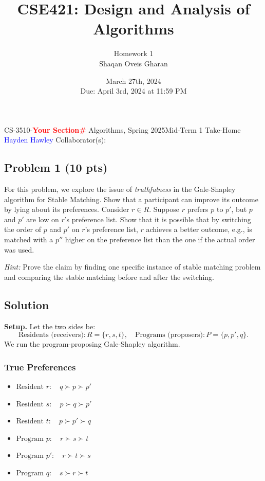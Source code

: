 \documentclass[12pt]{article}
\title{\textbf{CSE421: Design and Analysis of Algorithms}}
\author{Homework 1 \\ Shaqan Oveis Gharan}
\date{March 27th, 2024 \\ Due: April 3rd, 2024 at 11:59 PM}
\newcommand{\red}[1]{\textcolor{red}{#1}}
\newcommand{\blue}[1]{\textcolor{blue}{#1}}
\begin{document}
\noindent CS-3510-\textbf{\red{Your Section\#}} Algorithms, Spring 2025\hfill Mid-Term 1 Take-Home\\
\blue{Hayden} \blue{Hawley} \hfill Collaborator(s):

\hrulefill

\subsection*{Problem 1 (10 pts)}
For this problem, we explore the issue of \textit{truthfulness} in the Gale-Shapley algorithm for Stable Matching. Show that a participant can improve its outcome by lying about its preferences. Consider $r \in R$. Suppose $r$ prefers $p$ to $p'$, but $p$ and $p'$ are low on $r$'s preference list. Show that it is possible that by switching the order of $p$ and $p'$ on $r$'s preference list, $r$ achieves a better outcome, e.g., is matched with a $p''$ higher on the preference list than the one if the actual order was used.

\textit{Hint:} Prove the claim by finding one specific instance of stable matching problem and comparing the stable matching before and after the switching.

\subsection*{Solution}

\textbf{Setup.} Let the two sides be:
\[
\text{Residents (receivers)}: R = \{r, s, t\}, 
\quad
\text{Programs (proposers)}: P = \{p, p', q\}.
\]
We run the program-proposing Gale-Shapley algorithm.

\subsubsection*{True Preferences}
\begin{itemize}
    \item \(\text{Resident }r:\quad q \succ p \succ p'\)
    \item \(\text{Resident }s:\quad p \succ q \succ p'\)
    \item \(\text{Resident }t:\quad p \succ p' \succ q\)
    \item \(\text{Program }p:\quad r \succ s \succ t\)
    \item \(\text{Program }p':\quad r \succ t \succ s\)
    \item \(\text{Program }q:\quad s \succ r \succ t\)
\end{itemize}
\end{document}
